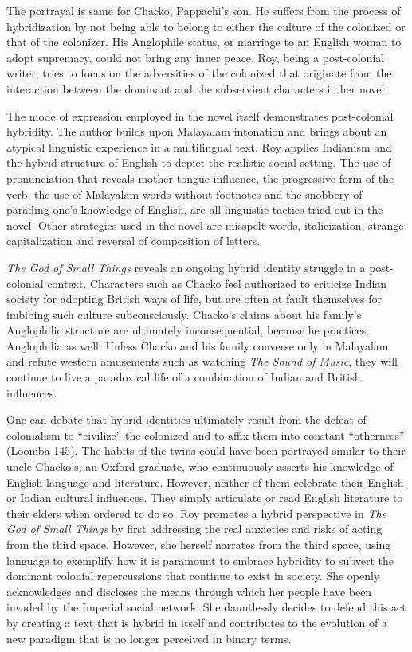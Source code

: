 The portrayal is same for Chacko, Pappachi's son. He suffers from the process of hybridization by not being able to belong to either the culture of the colonized or that of the colonizer. His Anglophile status, or marriage to an English woman to adopt supremacy, could not bring any inner peace. Roy, being a post-colonial writer, tries to focus on the adversities of the colonized that originate from the interaction between the dominant and the subservient characters in her novel. 

The mode of expression employed in the novel itself demonstrates post-colonial hybridity. The author builds upon Malayalam intonation and brings about an atypical linguistic experience in a multilingual text. Roy applies Indianism and the hybrid structure of English to depict the realistic social setting. The use of pronunciation that reveals mother tongue influence, the progressive form of the verb, the use of Malayalam words without footnotes and the snobbery of parading one's knowledge of English, are all linguistic tactics tried out in the novel. Other strategies used in the novel are misspelt words, italicization, strange capitalization and reversal of composition of letters. 

\emph{The God of Small Things }reveals an ongoing hybrid identity struggle in a post-colonial context. Characters such as Chacko feel authorized to criticize Indian society for adopting British ways of life, but are often at fault themselves for imbibing such culture subconsciously. Chacko's claims about his family's Anglophilic structure are ultimately inconsequential, because he practices Anglophilia as well. Unless Chacko and his family converse only in Malayalam and refute western amusements such as watching \emph{The Sound of Music}, they will continue to live a paradoxical life of a combination of Indian and British influences. 

One can debate that hybrid identities ultimately result from the defeat of colonialism to ``civilize'' the colonized and to affix them into constant ``otherness'' (Loomba 145). The habits of the twins could have been portrayed similar to their uncle Chacko's, an Oxford graduate, who continuously asserts his knowledge of English language and literature. However, neither of them celebrate their English or Indian cultural influences. They simply articulate or read English literature to their elders when ordered to do so. Roy promotes a hybrid perspective in \emph{The God of Small Things} by first addressing the real anxieties and risks of acting from the third space. However, she herself narrates from the third space, using language to exemplify how it is paramount to embrace hybridity to subvert the dominant colonial repercussions that continue to exist in society. She openly acknowledges and discloses the means through which her people have been invaded by the Imperial social network. She dauntlessly decides to defend this act by creating a text that is hybrid in itself and contributes to the evolution of a new paradigm that is no longer perceived in binary terms. 

